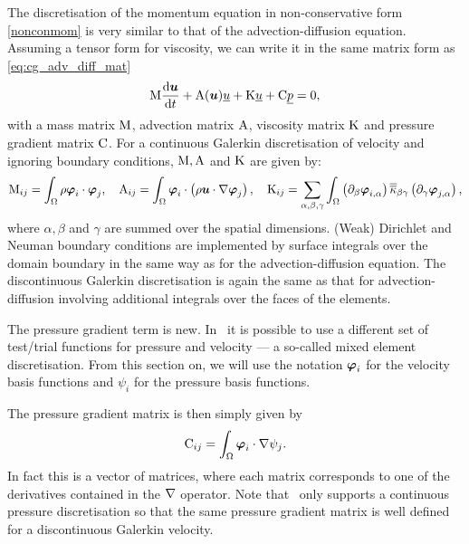\label{sec:ND_momentum_equation}
The discretisation of the momentum equation in non-conservative
form \eqref{nonconmom} is very similar to that of the advection-diffusion 
equation. Assuming a tensor form for viscosity, we
can write it in the same matrix form as
\eqref{eq:cg_adv_diff_mat}
\begin{equation}\label{eq:momentum_equation}
  \mathrm{M} \frac{\mathrm{d}{\mbox{\boldmath$u$}}}{\mathrm{d} t}
    +\mathrm{A}({\mbox{\boldmath$u$}})\underline{u}+\mathrm{K}\underline{ u}
    +\mathrm{C} \underline{p}
    =0,
\end{equation}
with a mass matrix $\mathrm{M}$, advection matrix $\mathrm{A}$,
viscosity matrix $\mathrm{K}$ and pressure gradient matrix $\mathrm{C}$.
For a continuous Galerkin discretisation of
velocity and ignoring boundary conditions, $\mathrm{M}, \mathrm{A}$ and $\mathrm{K}$
are given by:
\begin{equation}
  \mathrm{M}_{ij}=\int_\Omega \rho{\mbox{\boldmath$\varphi$}}_i\cdot{\mbox{\boldmath$\varphi$}}_j, \quad
  \mathrm{A}_{ij}=\int_\Omega {\mbox{\boldmath$\varphi$}}_i\cdot\left(\rho{\mbox{\boldmath$u$}}\cdot\nabla {\mbox{\boldmath$\varphi$}}_j\right), \quad
  \mathrm{K}_{ij}=\sum_{\alpha,\beta,\gamma} \int_\Omega
    \left(\partial_\beta{\mbox{\boldmath$\varphi$}}_{i,\alpha}\right) \overline{\overline{\kappa}}_{\beta\gamma}
      \left(\partial_\gamma {\mbox{\boldmath$\varphi$}}_{j,\alpha}\right),
\end{equation}
where $\alpha,\beta$ and $\gamma$ are summed over the spatial dimensions.
(Weak) Dirichlet and Neuman boundary conditions are implemented by
surface integrals over the domain boundary in the same way
as for the advection-diffusion equation. The discontinuous Galerkin
discretisation is again the same as that for advection-diffusion
involving additional integrals over the faces of the elements.

The pressure gradient term is new. In \fluidity\ it is possible
to use a different set of test/trial functions for pressure
and velocity --- a so-called mixed element discretisation. From this section
on, we will use the notation ${\mbox{\boldmath$\varphi$}}_i$ for the velocity
basis functions and $\psi_i$ for the pressure basis functions.

The pressure gradient matrix is then simply given by
\begin{equation}
  \mathrm{C}_{ij}=\int_\Omega {\mbox{\boldmath$\varphi$}}_i\cdot\nabla\psi_j. \label{pgmatrix}
\end{equation}
In fact this is a vector of matrices, where each matrix corresponds
to one of the derivatives contained in the $\nabla$ operator. Note that \fluidity\ only supports
a continuous pressure discretisation so that the same
pressure gradient matrix is well defined for a discontinuous Galerkin
velocity.

